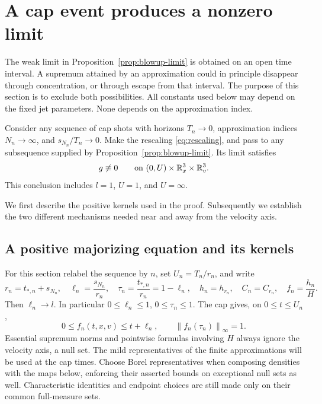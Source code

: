 \section{A cap event produces a nonzero limit}
\label{nc:section}

The weak limit in Proposition~\ref{prop:blowup-limit} is obtained on an
open time interval.  A supremum attained by an approximation could in
principle disappear through concentration, or through escape from that
interval.  The purpose of this section is to exclude both possibilities.
All constants used below may depend on the fixed jet parameters.  None
depends on the approximation index.

\begin{proposition}
\label{prop:nonzero-limit}
Consider any sequence of cap shots with horizons \(T_n\to0\),
approximation indices \(N_n\to\infty\), and
\(s_{N_n}/T_n\to0\).  Make the rescaling
\eqref{eq:rescaling}, and pass to any subsequence supplied by
Proposition~\ref{prop:blowup-limit}.  Its limit satisfies
\[
 g\not\equiv0\qquad\text{on }(0,U)\times\mathbb R^3_x\times\mathbb R^3_v.
\]
This conclusion includes \(l=1\), \(U=1\), and \(U=\infty\).
\end{proposition}

We first describe the positive kernels used in the proof.  Subsequently
we establish the two different mechanisms needed near and away from the
velocity axis.

\subsection{A positive majorizing equation and its kernels}

For this section relabel the sequence by \(n\), set \(U_n=T_n/r_n\),
and write
\[
 r_n=t_{*,n}+s_{N_n},\quad
 \ell_n=\frac{s_{N_n}}{r_n},\quad
 \tau_n=\frac{t_{*,n}}{r_n}=1-\ell_n,\quad
 h_n=h_{r_n},\quad C_n=C_{r_n},\quad f_n=\frac{h_n}{H}.
\]
Then \(\ell_n\to l\). In particular \(0\le\ell_n\le1\),
\(0\le\tau_n\le1\). The cap gives, on \(0\le t\le U_n\),
\begin{equation}
\label{nc:cap-normalized}
 0\le f_n(t,x,v)\le t+\ell_n,\qquad
 \left\|f_n(\tau_n)\right\|_\infty=1.
\end{equation}
Essential supremum norms and pointwise formulas involving \(H\) always
ignore the velocity axis, a null set.  The mild representatives of the
finite approximations will be used at the cap times.
Choose Borel representatives when composing densities with the maps
below, enforcing their asserted bounds on exceptional null sets as
well.  Characteristic identities and endpoint choices are still made
only on their common full-measure sets.

